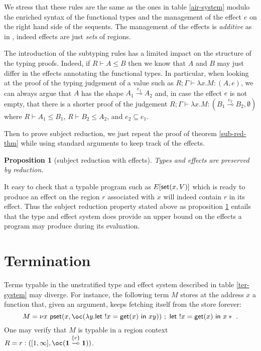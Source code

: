 \documentclass[11pt]{article}
\newtheorem{proposition}[theorem]{Proposition}
\newcommand{\Gives}{\vdash}             \newcommand{\IGives}{\vdash_{I}}        \newcommand{\AIGives}{\vdash_{{\it AI}}} \newcommand{\CGives}{\vdash_{C}}
\newcommand{\limpe}[1]{\stackrel{#1}{\multimap}}
\newcommand{\hyp}[3]{#1:(#2, #3)}
\newcommand{\letm}[3]{{\sf let} \ ! #1 = #2 \ {\sf in} \ #3}    \newcommand{\tertype}{{\bf 1}}
\newcommand{\set}[1]{\{#1\}}
\newcommand{\pst}[2]{{\sf pset}(#1,#2)}
\newcommand{\st}[2]{{\sf set}(#1,#2)}
\newcommand{\get}[1]{{\sf get}(#1)}
\newcommand{\new}[2]{\nu #1 \ #2}
\newcommand{\upair}[2]{[#1,#2]}
\begin{document}
We stress that these rules are the same as the ones in table
\ref{air-system} modulo the enriched syntax of the functional types and the
management of the effect $e$ on the right hand side of the 
sequents. The management of the effects is {\em additive} as in
\cite{LG88}, indeed effects are just {\em sets} of regions.

The introduction of the subtyping rules has a limited impact
on the structure of the typing proofs. Indeed, if $R\Gives A\leq B$
then we know that $A$ and $B$ may just differ in the effects 
annotating the functional types. In particular, when looking at the
proof of the typing judgement of a value such as 
$R;\Gamma \Gives \lambda x.M: (A,e)$,  we can always argue that 
$A$ has the shape $A_1\limpe{e_{1}} A_2$ and, in case the effect $e$
is not empty, that there is a shorter proof of the judgement
$R;\Gamma \Gives \lambda x.M:(B_1\limpe{e_{2}} B_2,\emptyset)$ where
$R\Gives A_1\leq B_1$, $R\Gives B_2\leq A_2$, and $e_2\subseteq e_1$.


Then to prove subject reduction, we just repeat the proof of
theorem \ref{sub-red-thm} while using standard arguments to keep 
track of the effects.

\begin{proposition}[subject reduction with effects]\label{sub-red-eff-thm}
Types and effects are preserved by reduction.
\end{proposition}

It easy to check that a typable program such as $E[\st{x}{V}]$ which
is ready to produce an effect on the region $r$ associated with $x$
will indeed contain $r$ in its effect. Thus the subject reduction
property stated above as proposition \ref{sub-red-eff-thm}
entails that the type and effect system does provide an upper bound on
the effects a program may produce during its evaluation.



\section{Termination}\label{termination-sec}
Terms typable in the unstratified type and effect system described in table \ref{ter-system}
may diverge. For instance, the following term $M$ stores at the address $x$ a function 
that, given an argument, keeps fetching itself from the store forever:
\begin{equation}
M = \new{x}{\pst{x}{\bang (\lambda y.\letm{x}{\get{x}}{xy  } )}  \ ; \ \letm{x}{\get{x}}{x*}}~.
\end{equation}
One may verify that $M$ is typable in a region context 
$R=\hyp{r}{\upair{1}{\infty}}{\bang(\tertype \limpe{\set{r}} \tertype)}$.
\end{document}
